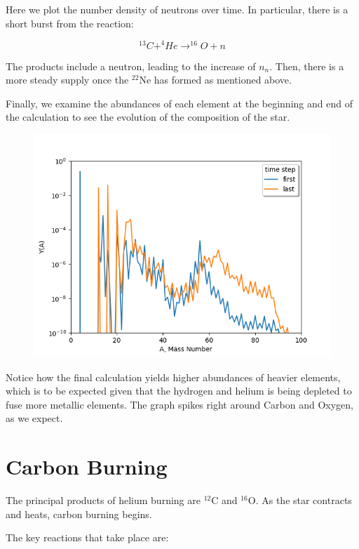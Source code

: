 \documentclass[manuscript]{aastex62}
\begin{document}
Here we plot the number density of neutrons over time. In particular, there is a short burst from the reaction:

\begin{equation}
^{13}C + ^4He \rightarrow ^{16}O + n
\end{equation}

The products include a neutron, leading to the increase of $n_n$. Then, there is a more steady supply once the $^{22}$Ne has formed as mentioned above.

Finally, we examine the abundances of each element at the beginning and end of the calculation to see the evolution of the composition of the star. 

\begin{figure}[H]
\centering
\includegraphics[scale=0.7]{task3_2}
\end{figure}

Notice how the final calculation yields higher abundances of heavier elements, which is to be expected given that the hydrogen and helium is being depleted to fuse more metallic elements. The graph spikes right around Carbon and Oxygen, as we expect.

\section{Carbon Burning} \label{sec:C}



The principal products of helium burning are $^{12}$C and $^{16}$O.  As the
star contracts and heats, carbon burning begins.

The key reactions that take place are:
\end{document}
